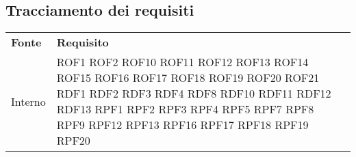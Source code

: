 \subsection{Tracciamento dei requisiti}
\begin{longtable}{| p{5cm} | p{5cm} |}
		\rowcolor{LightBlue}
		\color{white}\bfseries Fonte & \color{white}\bfseries Requisito \\[0.25cm]
		Interno & 	ROF1 \newline
					ROF2 \newline
					ROF10 \newline
					ROF11 \newline
					ROF12 \newline
					ROF13 \newline
					ROF14 \newline
					ROF15 \newline
					ROF16 \newline
					ROF17 \newline
					ROF18 \newline
					ROF19 \newline
					ROF20 \newline
					ROF21 \newline
					RDF1 \newline
					RDF2 \newline
					RDF3 \newline
					RDF4 \newline
					RDF8 \newline
					RDF10 \newline
					RDF11 \newline
					RDF12 \newline
					RDF13 \newline
					RPF1 \newline
					RPF2 \newline
					RPF3 \newline
					RPF4 \newline
					RPF5 \newline
					RPF7 \newline
					RPF8 \newline
					RPF9 \newline
					RPF12 \newline
					RPF13 \newline
					RPF16 \newline
					RPF17 \newline
					RPF18 \newline
					RPF19 \newline
					RPF20 \newline
					 \\
					

\end{longtable}
